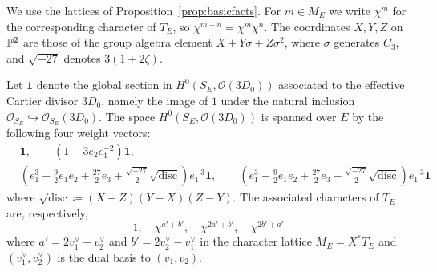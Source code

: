 \begin{lemma}

\label{lemma:heightformula}


\leanok

We use the lattices of Proposition~\ref{prop:basicfacts}. For $m\in M_E$ we write $\chi^m$ for the corresponding character of $T_E$, so $\chi^{m+n}=\chi^m\chi^n$. The coordinates $X,Y,Z$ on $\mathbb{P}^2$ are those of the group algebra element $X+Y\sigma+Z\sigma^2$, where $\sigma$ generates $C_3$, and $\sqrt{-27}$ denotes $3(1+2\zeta)$.

 Let $\mathbf 1$ denote the global section in $H^0(S_E,\mathcal O(3D_0))$ associated to the effective Cartier divisor $3D_0$, namely the image of $1$ under the natural inclusion $\mathcal O_{S_E}\hookrightarrow\mathcal O_{S_E}(3D_0)$. The space $H^0(S_E,\mathcal O(3D_0))$ is spanned over $E$ by the following four weight vectors: \begin{align*} &\mathbf 1,\qquad (1-3e_2e_1^{-2})\mathbf 1, \\ &(e_1^3-\tfrac 92 e_1 e_2+ \tfrac{27}{2} e_3 + \tfrac{\sqrt{-27}}{2} \sqrt{\mathrm{disc}}) e_1^{-3}\mathbf 1,\qquad (e_1^3-\tfrac 92 e_1 e_2+ \tfrac{27}{2} e_3 - \tfrac{\sqrt{-27}}{2} \sqrt{\mathrm{disc}}) e_1^{-3}\mathbf 1 \end{align*} where $\sqrt{\mathrm{disc}} \coloneq (X-Z)(Y-X)(Z-Y)$. The associated characters of $T_E$ are, respectively, \begin{equation*} 1,\quad \chi^{a'+b'},\quad \chi^{2a'+b'},\quad\chi^{2b'+a'} \end{equation*} where $a' = 2v_1^\vee - v_2^\vee$ and $b' = 2v_2^\vee - v_1^\vee$ in the character lattice $M_E = X^\ast T_E$ and $(v_1^\vee,v_2^\vee)$ is the dual basis to $(v_1,v_2)$. 

\end{lemma}

